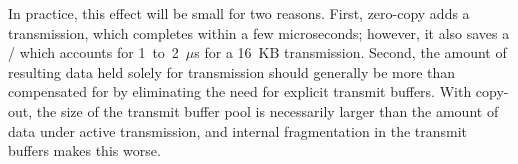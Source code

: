 In practice, this effect will be small for two reasons. First, zero-copy adds a
transmission, which completes within a few microseconds; however, it also saves a
\memcpy/  which accounts for 1~to~2~$\mu$s for a 16~KB transmission. Second, the
amount of resulting data held solely for transmission should generally be
more than compensated for by eliminating the need for explicit transmit
buffers. With copy-out, the size of the transmit buffer pool is necessarily
larger than the amount of data under active transmission, and internal
fragmentation in the transmit buffers makes this worse.


